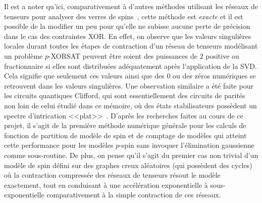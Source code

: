 Il est a noter qu'ici, comparativement à d'autres méthodes utilisant les réseaux de tenseurs pour analyser des verres de spins~\cite{zhu2019tensor}, cette méthode est \emph{exacte} et il est possible de la modifier un peu pour qu'elle ne subisse aucune perte de précision dans le cas des contraintes XOR.
En effet, on observe que les valeurs singulières locales durant toutes les étapes de contraction d'un réseau de tenseurs modélisant un problème $p$-XORSAT peuvent être soient des puissances de $2$ positive ou fractionnaire si elles sont distribuées adéquatement après l'application de la SVD.
Cela signifie que seulement ces valeurs ainsi que des $0$ ou des zéros numériques se retrouvent dans les valeurs singulières.
Une observation similaire a été faite pour les circuits quantiques Clifford, qui sont essentiellement des circuits de parités non loin de celui étudié dans ce mémoire, où des états stabilisateurs possèdent un spectre d'intrication <<plat>>~\cite{fattal2004entanglement, Hamma2005entropy, zhou2020Clifford}.
D'après les recherches faites au cours de ce projet, il s'agit de la première méthode numérique générale pour les calculs de fonction de partition de modèle de spin et de comptage de modèles qui atteint cette performance pour les modèles $p$-spin sans invoquer l'élimination gaussienne comme sous-routine.
De plus, on pense qu'il s'agit du premier cas non trivial d'un modèle de spin défini sur des graphes creux aléatoires (qui possèdent des cycles) où la contraction compressée des réseaux de tenseurs résout le modèle exactement, tout en conduisant à une accélération exponentielle à sous-exponentielle comparativement à la simple contraction de ces réseaux.

